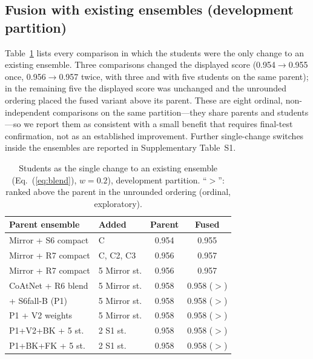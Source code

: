 \documentclass{ieeeaccess}
\begin{document}
\subsection{Fusion with existing ensembles (development partition)}
\label{sec:res-ens}
Table~\ref{tab:ens} lists every comparison in which the students were the only change to an existing ensemble. Three
comparisons changed the displayed score (0.954$\to$0.955 once, 0.956$\to$0.957 twice, with three and with five students on
the same parent); in the remaining five the displayed score was unchanged and the unrounded ordering placed the fused variant above its parent. These are eight ordinal, non-independent
comparisons on the same partition---they share parents and students---so we report them as consistent with a small benefit
that requires final-test confirmation, not as an established improvement. Further single-change switches inside the
ensembles are reported in Supplementary Table~S1.

\begin{table}[!t]
\centering
\caption{Students as the single change to an existing ensemble (Eq.~(\ref{eq:blend}), $w=0.2$), development partition.
``$>$'': ranked above the parent in the unrounded ordering (ordinal, exploratory).}
\label{tab:ens}
\footnotesize
\setlength{\tabcolsep}{2.5pt}
\begin{tabular}{llcc}
\toprule
Parent ensemble & Added & Parent & Fused\\
\midrule
Mirror + S6 compact & C & 0.954 & 0.955\\
Mirror + R7 compact & C, C2, C3 & 0.956 & 0.957\\
Mirror + R7 compact & 5 Mirror st. & 0.956 & 0.957\\
CoAtNet + R6 blend & 5 Mirror st. & 0.958 & 0.958 ($>$)\\
+ S6fall-B (P1) & 5 Mirror st. & 0.958 & 0.958 ($>$)\\
P1 + V2 weights & 5 Mirror st. & 0.958 & 0.958 ($>$)\\
P1+V2+BK + 5 st. & 2 S1 st. & 0.958 & 0.958 ($>$)\\
P1+BK+FK + 5 st. & 2 S1 st. & 0.958 & 0.958 ($>$)\\
\bottomrule
\end{tabular}
\end{table}
\end{document}
